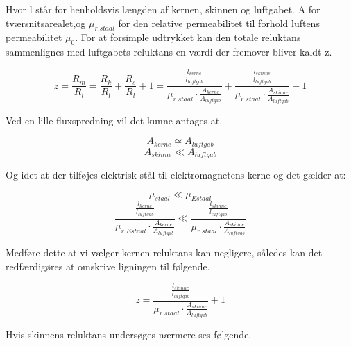 Hvor l står for henholdsvis længden af kernen, skinnen og luftgabet. A for tværsnitsarealet,og $ \mu_{r.staal} $ for den relative permeabilitet til forhold luftens permeabilitet $\mu_0$.  For at forsimple udtrykket kan den totale reluktans sammenlignes med luftgabets reluktans en værdi  der fremover bliver kaldt z.

\begin{equation}
z = \frac{R_m}{R_l} = \frac{R_k}{R_l} +\frac{R_s}{R_l} + 1 = \frac{
\frac{l_{kerne}}{l_{luftgab}} }
	{\mu_{r.staal} \cdot \frac{A_{kerne}}{A_{luftgab}} }
+
\frac{
	\frac{l_{skinne}}{l_{luftgab}} }
{\mu_{r.staal} \cdot \frac{A_{skinne}}{A_{luftgab}} }
+ 1
\end{equation}

Ved en lille fluxspredning vil det kunne antages at.

\begin{equation}
A_{kerne} \simeq A_{luftgab}
\end{equation}
\begin{equation}
A_{skinne} \ll A_{luftgab}
\end{equation}

Og idet at der tilføjes elektrisk stål til elektromagnetens kerne og det gælder at:

\begin{equation}
\mu_{staal} \ll \mu_{Estaal}
\end{equation}
\begin{equation}
  \frac{\frac{l_{kerne}}{l_{luftgab}}}{
  	{\mu_{r.Estaal} \cdot \frac{A_{kerne}}{A_{luftgab}} }} \ll \frac{
	\frac{l_{skinne}}{l_{luftgab}} }
{\mu_{r.staal} \cdot \frac{A_{skinne}}{A_{luftgab}} }
\end{equation}

Medføre dette at vi vælger kernen reluktans kan negligere, således kan det redfærdigøres at omskrive ligningen til følgende.

\begin{equation}
z =
\frac{
	\frac{l_{skinne}}{l_{luftgab}} }
{\mu_{r.staal} \cdot \frac{A_{skinne}}{A_{luftgab}} }
+ 1
\end{equation}

Hvis skinnens reluktans undersøges nærmere ses følgende.


